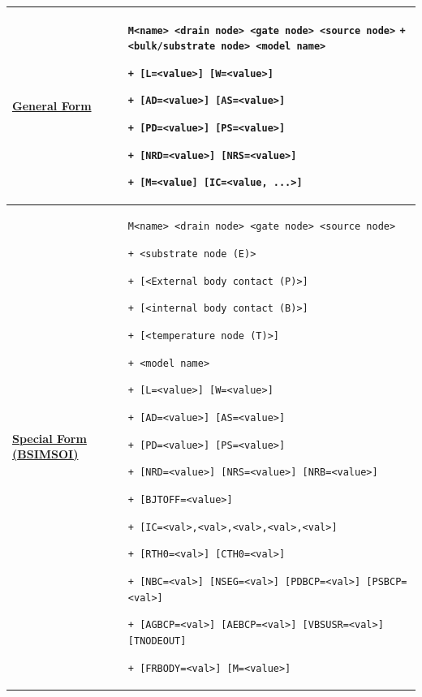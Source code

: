 


\small
\begin{longtable}[Hh]{>{\setlength{\hsize}{.4\hsize}}YY} \hline

\underline{\bf General Form} &
\verb|M<name> <drain node> <gate node> <source node>|
\verb|+ <bulk/substrate node> <model name> |

\verb|+ [L=<value>] [W=<value>] |

\verb|+ [AD=<value>] [AS=<value>] |

\verb|+ [PD=<value>] [PS=<value>] |

\verb|+ [NRD=<value>] [NRS=<value>] |

\verb|+ [M=<value] [IC=<value, ...>] |
\\ \hline
\underline{\bf Special Form (BSIMSOI)} &
\verb|M<name> <drain node> <gate node> <source node>|

\verb|+ <substrate node (E)> |

\verb|+ [<External body contact (P)>]|

\verb|+ [<internal body contact (B)>]|

\verb|+ [<temperature node (T)>] |

\verb|+ <model name> |

\verb|+ [L=<value>] [W=<value>] |

\verb|+ [AD=<value>] [AS=<value>] |

\verb|+ [PD=<value>] [PS=<value>] |

\verb|+ [NRD=<value>] [NRS=<value>] [NRB=<value>]|

\verb|+ [BJTOFF=<value>]|

\verb|+ [IC=<val>,<val>,<val>,<val>,<val>] |

\verb|+ [RTH0=<val>] [CTH0=<val>]|

\verb|+ [NBC=<val>] [NSEG=<val>] [PDBCP=<val>] [PSBCP=<val>]|

\verb|+ [AGBCP=<val>] [AEBCP=<val>] [VBSUSR=<val>] [TNODEOUT]|

\verb|+ [FRBODY=<val>] [M=<value>] |

 \\ \hline


\end{longtable}
